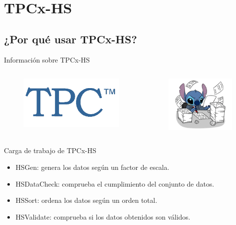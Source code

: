 
\section{TPCx-HS}

	\subsection*{¿Por qué usar TPCx-HS?}

		\begin{frame}{Información sobre TPCx-HS}
			\begin{columns}[c]
				\begin{figure}[h]
					\centering
					\includegraphics[width=6cm]{./Images/tpc-logo.png}
				\end{figure}
			
			
				\begin{figure}[H]
							\centering
							\includegraphics[width=4cm]{./Images/hardwork.png}
						\end{figure}
					\end{columns}
			
			{\color{ChetwodeBlue}\large Carga de trabajo de TPCx-HS}
			
			\begin{itemize}
				\item HSGen: genera los datos según un factor de escala.
				\item HSDataCheck: comprueba el cumplimiento del conjunto de datos.
				\item HSSort: ordena los datos según un orden total.
				\item HSValidate: comprueba si los datos obtenidos son válidos.
			\end{itemize}		
		\end{frame}
	

